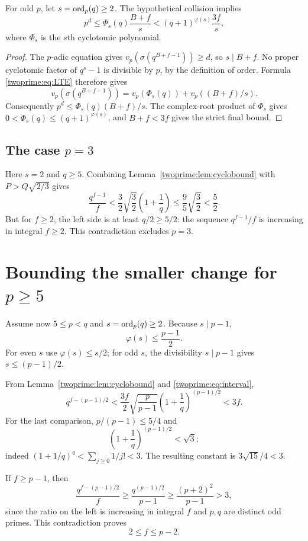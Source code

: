 \begin{lemma}\label{twoprime:lem:cyclobound}
For odd $p$, let $s=\operatorname{ord}_p(q)\ge2$. The hypothetical collision implies
\[
 \boxed{p^d\le\Phi_s(q)\frac{B+f}{s}
 <(q+1)^{\varphi(s)}\frac{3f}{s},}
\]
where $\Phi_s$ is the $s$th cyclotomic polynomial.
\end{lemma}
\begin{proof}
The $p$-adic equation gives $v_p(\sigma(q^{B+f-1}))\ge d$, so $s\mid B+f$. No proper cyclotomic factor of $q^s-1$ is divisible by $p$, by the definition of order. Formula \eqref{twoprime:eq:LTE} therefore gives
\[
 v_p(\sigma(q^{B+f-1}))
 =v_p(\Phi_s(q))+v_p((B+f)/s).
\]
Consequently $p^d\le\Phi_s(q)(B+f)/s$. The complex-root product of $\Phi_s$ gives $0<\Phi_s(q)\le(q+1)^{\varphi(s)}$, and $B+f<3f$ gives the strict final bound.
\end{proof}

\subsection*{The case $p=3$}
Here $s=2$ and $q\ge5$. Combining Lemma~\ref{twoprime:lem:cyclobound} with $P>Q\sqrt{2/3}$ gives
\[
 \frac{q^{f-1}}{f}
 <\frac32\sqrt{\frac32}\left(1+\frac1q\right)
 \le\frac95\sqrt{\frac32}<\frac52.
\]
But for $f\ge2$, the left side is at least $q/2\ge5/2$: the sequence $q^{f-1}/f$ is increasing in integral $f\ge2$. This contradiction excludes $p=3$.


\section{Bounding the smaller change for \texorpdfstring{$p\ge5$}{p at least 5}}
Assume now $5\le p<q$ and $s=\operatorname{ord}_p(q)\ge2$. Because $s\mid p-1$,
\[
 \varphi(s)\le\frac{p-1}{2}.
\]
For even $s$ use $\varphi(s)\le s/2$; for odd $s$, the divisibility $s\mid p-1$ gives $s\le(p-1)/2$.

From Lemma~\ref{twoprime:lem:cyclobound} and \eqref{twoprime:eq:interval},
\[
 q^{f-(p-1)/2}
 <\frac{3f}{2}\sqrt{\frac p{p-1}}
 \left(1+\frac1q\right)^{(p-1)/2}<3f.
\]
For the last comparison, $p/(p-1)\le5/4$ and
\[
 \left(1+\frac1q\right)^{(p-1)/2}<\sqrt3;
\]
indeed $(1+1/q)^q<\sum_{j\ge0}1/j!<3$. The resulting constant is $3\sqrt{15}/4<3$.

If $f\ge p-1$, then
\[
 \frac{q^{f-(p-1)/2}}{f}
 \ge\frac{q^{(p-1)/2}}{p-1}
 \ge\frac{(p+2)^2}{p-1}>3,
\]
since the ratio on the left is increasing in integral $f$ and $p,q$ are distinct odd primes. This contradiction proves
\begin{equation}\label{twoprime:eq:fbound}
 \boxed{2\le f\le p-2.}
\end{equation}


